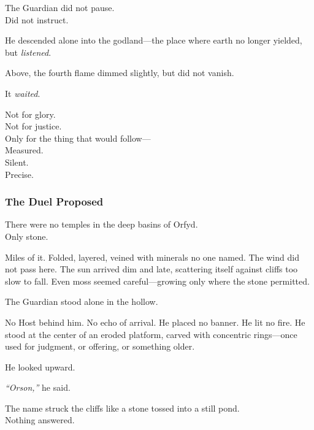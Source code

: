 \documentclass[12pt]{article}
\begin{document}
\vspace{0.5em}
The Guardian did not pause.\\
Did not instruct.

\vspace{0.5em}
He descended alone into the godland---the place where earth no longer yielded, but \textit{listened}.

\vspace{0.5em}
Above, the fourth flame dimmed slightly, but did not vanish.

\vspace{0.5em}
It \textit{waited}.

\vspace{0.5em}
Not for glory.\\
Not for justice.\\
Only for the thing that would follow---\\
Measured.\\
Silent.\\
Precise.


\dotfill

\subsubsection{The Duel Proposed}

There were no temples in the deep basins of Orfyd.\\
Only stone.

\vspace{0.5em}
Miles of it. Folded, layered, veined with minerals no one named. The wind did not pass here. The sun arrived dim and late, scattering itself against cliffs too slow to fall. Even moss seemed careful---growing only where the stone permitted.

\vspace{0.5em}
The Guardian stood alone in the hollow.

\vspace{0.5em}
No Host behind him. No echo of arrival. He placed no banner. He lit no fire. He stood at the center of an eroded platform, carved with concentric rings---once used for judgment, or offering, or something older.

\vspace{0.5em}
He looked upward.

\vspace{0.5em}
\textit{``Orson,''} he said.

\vspace{0.5em}
The name struck the cliffs like a stone tossed into a still pond.\\
Nothing answered.
\end{document}
